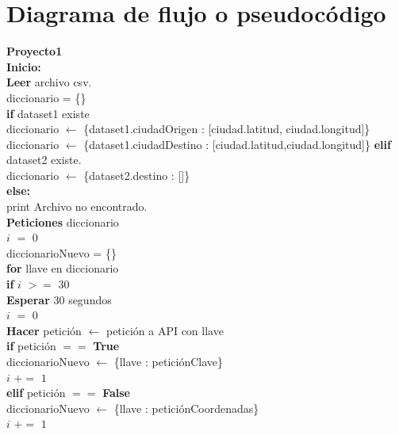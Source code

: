 \documentclass[]{article}
\begin{document}
\section{Diagrama de flujo o pseudocódigo}
\textbf{Proyecto1}\\
\textbf{Inicio:}\\
\indent \textbf{Leer} archivo csv.\\
\indent\indent diccionario = \{\}\\
\indent\indent \textbf{if} dataset1 existe\\
\indent\indent\indent diccionario $ \leftarrow $ \{dataset1.ciudadOrigen : 
[ciudad.latitud, ciudad.longitud]\} \\
\indent\indent\indent diccionario $ \leftarrow $ \{dataset1.ciudadDestino : 
[ciudad.latitud,ciudad.longitud]\}
\indent\indent \textbf{elif} dataset2 existe.\\
\indent\indent\indent diccionario $ \leftarrow $ \{dataset2.destino : []\}\\
\indent\indent \textbf{else:}\\
\indent\indent\indent print Archivo no encontrado.\\
\indent \textbf{Peticiones} diccionario\\
\indent\indent $ i $ $ = $ $ 0 $\\
\indent\indent diccionarioNuevo = \{\} \\
\indent\indent \textbf{for} llave en diccionario\\
\indent\indent\indent \textbf{if} $ i $ $ >= $ $ 30 $\\
\indent\indent\indent\indent \textbf{Esperar} 30 segundos\\
\indent\indent\indent\indent $ i $ $ = $ $ 0 $\\
\indent\indent\indent \textbf{Hacer} petición $ \leftarrow $ petición a API 
con llave\\
\indent\indent\indent \textbf{if} petición $ == $ \textbf{True}\\
\indent\indent\indent\indent diccionarioNuevo $ \leftarrow $ \{llave : 
peticiónClave\}\\
\indent\indent\indent\indent $ i $ $ += $ $ 1 $\\
\indent\indent\indent \textbf{elif} petición $ == $ \textbf{False}\\
\indent\indent\indent\indent diccionarioNuevo $ \leftarrow $ \{llave : 
peticiónCoordenadas\}\\
\indent\indent\indent\indent $ i $ $ += $ $ 1 $\\
\end{document}
